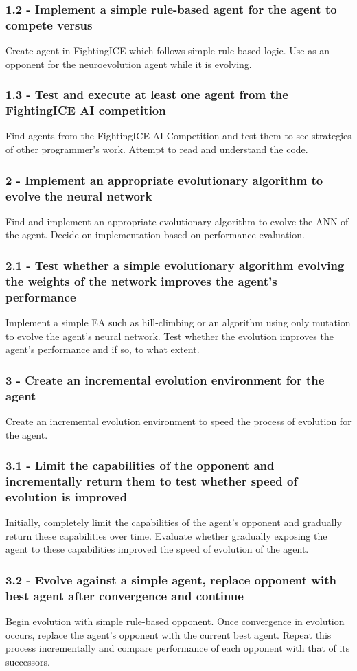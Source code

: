 \documentclass[12pt,a4paper]{article}
\begin{document}
\subsubsection*{1.2 - Implement a simple rule-based agent for the agent to compete versus}
Create agent in FightingICE which follows simple rule-based logic. Use as an opponent for the neuroevolution agent while it is evolving.
\subsubsection*{1.3 - Test and execute at least one agent from the FightingICE AI competition}
Find agents from the FightingICE AI Competition and test them to see strategies of other programmer's work. Attempt to read and understand the code.
\subsubsection*{2 - Implement an appropriate evolutionary algorithm to evolve the neural network}
Find and implement an appropriate evolutionary algorithm to evolve the ANN of the agent. Decide on implementation based on performance evaluation.
\subsubsection*{2.1 - Test whether a simple evolutionary algorithm evolving the weights of the network improves the agent's performance}
Implement a simple EA such as hill-climbing or an algorithm using only mutation to evolve the agent's neural network. Test whether the evolution improves the agent's performance and if so, to what extent.
\newpage
\subsubsection*{3 - Create an incremental evolution environment for the agent}
Create an incremental evolution environment to speed the process of evolution for the agent.
\subsubsection*{3.1 - Limit the capabilities of the opponent and incrementally return them to test whether speed of evolution is improved}
Initially, completely limit the capabilities of the agent's opponent and gradually return these capabilities over time. Evaluate whether gradually exposing the agent to these capabilities improved the speed of evolution of the agent.
\subsubsection*{3.2 - Evolve against a simple agent, replace opponent with best agent after convergence and continue}
Begin evolution with simple rule-based opponent. Once convergence in evolution occurs, replace the agent's opponent with the current best agent. Repeat this process incrementally and compare performance of each opponent with that of its successors.
\end{document}
